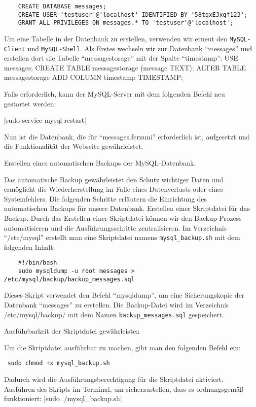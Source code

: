 \begin{verbatim}
    CREATE DATABASE messages;
    CREATE USER 'testuser'@'localhost' IDENTIFIED BY '58tqxEJxqf123';
    GRANT ALL PRIVILEGES ON messages.* TO 'testuser'@'localhost';
\end{verbatim}

Um eine Tabelle in der Datenbank zu erstellen, verwenden wir erneut den \verb+MySQL-Client+ und \verb+MySQL-Shell+.
Als Erstes wechseln wir zur Datenbank \enquote{messages} und erstellen dort die Tabelle \enquote{messagestorage} mit der Spalte \enquote{timestamp}:
USE messages;
CREATE TABLE messagestorage (message TEXT);
ALTER TABLE messagestorage ADD COLUMN timestamp TIMESTAMP;

Falls erforderlich, kann der MySQL-Server mit dem folgenden Befehl neu gestartet werden:

|sudo service mysql restart|

Nun ist die Datenbank, die für \enquote{messages.fernuni} erforderlich ist, aufgesetzt und die Funktionalität der Webseite gewährleistet.

Erstellen eines automatischen Backups der MySQL-Datenbank.

Das automatische Backup gewährleistet den Schutz wichtiger Daten und ermöglicht die Wiederherstellung im Falle eines Datenverlusts oder eines Systemfehlers. Die folgenden Schritte erläutern die Einrichtung des automatischen Backups für unsere Datenbank.
Erstellen einer Skriptdatei für das Backup.
Durch das Erstellen einer Skriptdatei können wir den Backup-Prozess automatisieren und die Ausführungsschritte zentralisieren.
Im Verzeichnis \enquote{/etc/mysql} erstellt man eine Skriptdatei namens \verb+mysql_backup.sh+ mit dem folgenden Inhalt:

\begin{verbatim}
    #!/bin/bash
    sudo mysqldump -u root messages > /etc/mysql/backup/backup_messages.sql
\end{verbatim}

Dieses Skript verwendet den Befehl \enquote{mysqldump}, um eine Sicherungskopie der Datenbank \enquote{messages} zu erstellen. 
Die Backup-Datei wird im Verzeichnis /etc/mysql/backup/ mit dem Namen \verb+backup_messages.sql+ gespeichert.

Ausführbarkeit der Skriptdatei gewährleisten

Um die Skriptdatei ausführbar zu machen, gibt man den folgenden Befehl ein:
\begin{verbatim} sudo chmod +x mysql_backup.sh \end{verbatim}
Dadurch wird die Ausführungsberechtigung für die Skriptdatei aktiviert.
Ausführen des Skripts im Terminal, um sicherzustellen, dass es ordnungsgemäß funktioniert:
|sudo ./mysql_backup.sh|

